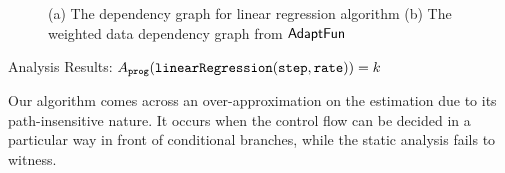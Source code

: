 \begin{example}
\begin{figure}
\begin{subfigure}{.33\textwidth}
\begin{centering}
         \caption{}
            \end{centering}
            \end{subfigure}
    \vspace{-0.4cm}
    \caption{(a) The dependency graph for linear regression algorithm 
    (b) The weighted data dependency graph from $\textsf{AdaptFun}$}
    \vspace{-0.2cm}
    \label{fig:linear_regression}
\end{figure}
%
Analysis Results: $ A_{\mathtt{prog}}(\mathtt{linearRegression(step, rate)}) = k$
\end{example} 
%
\begin{example}
Our algorithm comes across an over-approximation on the estimation due to its path-insensitive nature. It occurs when the control flow can be decided in a particular way in front of conditional branches, while the static analysis fails to witness. 


\end{example}
